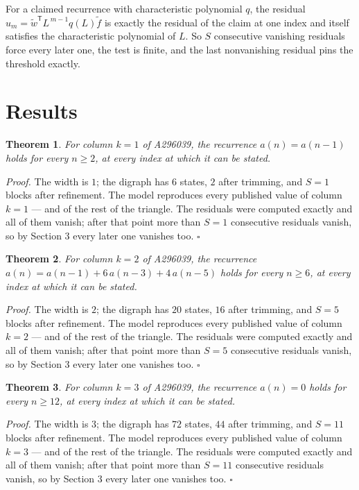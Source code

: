 \documentclass[11pt]{article}
\newtheorem{theorem}{Theorem}
\theoremstyle{definition}
\begin{document}
For a claimed recurrence with characteristic polynomial $q$, the residual $u_m = \tilde w^{\mathsf T}L^{\,m-1}q(L)\tilde f$ is exactly the residual of the claim at one index and itself satisfies the characteristic polynomial of $L$. So $S$ consecutive vanishing residuals force every later one, the test is finite, and the last nonvanishing residual pins the threshold exactly.

\section{Results}

\begin{theorem} For column $k = 1$ of A296039, the recurrence $a(n) = a(n-1)$ holds for every $n \ge 2$, at every index at which it can be stated.\end{theorem}

{\itshape Proof.} The width is $1$; the digraph has $6$ states, $2$ after trimming, and $S = 1$ blocks after refinement. The model reproduces every published value of column $k = 1$ --- and of the rest of the triangle. The residuals were computed exactly and all of them vanish; after that point more than $S = 1$ consecutive residuals vanish, so by Section 3 every later one vanishes too. $\square$

\begin{theorem} For column $k = 2$ of A296039, the recurrence $a(n) = a(n-1) + 6\,a(n-3) + 4\,a(n-5)$ holds for every $n \ge 6$, at every index at which it can be stated.\end{theorem}

{\itshape Proof.} The width is $2$; the digraph has $20$ states, $16$ after trimming, and $S = 5$ blocks after refinement. The model reproduces every published value of column $k = 2$ --- and of the rest of the triangle. The residuals were computed exactly and all of them vanish; after that point more than $S = 5$ consecutive residuals vanish, so by Section 3 every later one vanishes too. $\square$

\begin{theorem} For column $k = 3$ of A296039, the recurrence $a(n) = 0$ holds for every $n \ge 12$, at every index at which it can be stated.\end{theorem}

{\itshape Proof.} The width is $3$; the digraph has $72$ states, $44$ after trimming, and $S = 11$ blocks after refinement. The model reproduces every published value of column $k = 3$ --- and of the rest of the triangle. The residuals were computed exactly and all of them vanish; after that point more than $S = 11$ consecutive residuals vanish, so by Section 3 every later one vanishes too. $\square$
\end{document}
